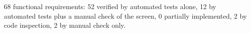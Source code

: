 68 functional requirements: 52 verified by automated tests alone, 12 by automated tests plus a manual check of the screen, 0 partially implemented, 2 by code inspection, 2 by manual check only.

